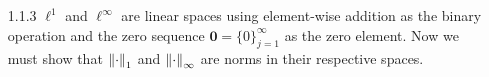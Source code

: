 \documentclass[../../Solutions.tex]{subfiles}
\begin{document}
\begin{itemize}
	\item [1.1.3] $\ell^1$ and $\ell^\infty$ are linear spaces using element-wise addition as the binary operation and the zero sequence $\mathbf{0} = \{0\}_{j=1}^\infty$ as the zero element.
	Now we must show that $\left\lVert\cdot\right\rVert_1$ and $\left\lVert\cdot\right\rVert_\infty$ are norms in their respective spaces.
	
\end{itemize}
\end{document}
